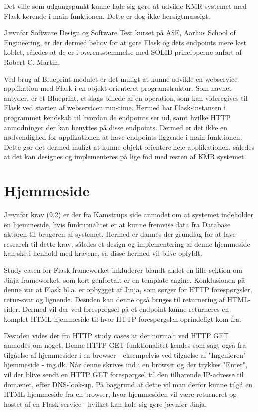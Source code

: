 \begin{appendices}
Det ville som udgangspunkt kunne lade sig gøre at udvikle KMR systemet med Flask kørende i main-funktionen. Dette er dog ikke hensigtmæssigt.

Jævnfør Software Design og Software Test kurset på ASE, Aarhus School of Engineering, er der dermed behov for at gøre Flask og dets endpoints mere løst koblet, således at de er i overensstemmelse med SOLID principperne anført af Robert C. Martin.

Ved brug af Blueprint-modulet er det muligt at kunne udvikle en webservice applikation med Flask i en objekt-orienteret programstruktur. Som navnet antyder, er et Blueprint, et slags billede af en operation, som kan videregives til Flask ved starten af webservicen run-time. Hermed har Flask-instansen i programmet kendskab til hvordan de endpoints ser ud, samt hvilke HTTP anmodninger der kan benyttes på disse endpoints. Dermed er det ikke en nødvendighed for applikationen at have endpoints liggende i main-funktionen. Dette gør det dermed muligt at kunne objekt-orientere hele applikationen, således at det kan designes og implementeres på lige fod med resten af KMR systemet.

\pagebreak

\section{Hjemmeside} \label{appendix::studycase::hjemmeside}

Jævnfør krav (9.2) er der fra Kamstrups side anmodet om at systemet indeholder en hjemmeside, hvis funktionalitet er at kunne fremvise data fra Database aktøren til brugeren af systemet. Hermed er dannes der grundlag for at lave research til dette krav, således et design og implementering af denne hjemmeside kan ske i henhold med kravene, så disse hermed vil blive opfyldt.

Study casen for Flask frameworket inkluderer blandt andet en lille sektion om Jinja frameworket, som kort genfortalt er en template engine. Konklusionen på denne var at Flask bl.a. er opbygget af Jinja, som sørger for HTTP forespørgsler, retur-svar og lignende. Desuden kan denne også bruges til returnering af HTML-sider. Dermed vil der ved forespørgsel på et endpoint kunne returneres en komplet HTML hjemmeside til hvor HTTP forespørgslen oprindeligt kom fra. 

Desuden vides der fra HTTP study cases at der normalt ved HTTP GET anmodes om noget. Denne HTTP GET funktionalitet kendes som sagt også fra tilgåelse af hjemmesider i en browser - eksempelvis ved tilgåelse af "Ingeniøren" hjemmeside - ing.dk. Når denne skrives ind i en browser og der trykkes "Enter", vil der blive sendt en HTTP GET forespørgsel til den tilhørende IP-adresse til domænet, efter DNS-look-up. På baggrund af dette vil man derfor kunne tilgå en HTML hjemmeside fra en browser, hvor hjemmesiden vil være returneret og hostet af en Flask service - hvilket kan lade sig gøre jævnfør Jinja.


\end{appendices}
